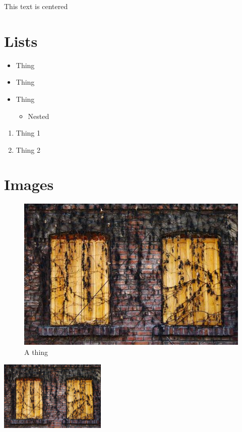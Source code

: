 \documentclass[10pt, letterpaper]{article}  %
\begin{document}
\begin{center}
    This text is centered
\end{center}



\section{Lists}

\begin{itemize}  %
    \item Thing
    \item Thing
    \item Thing
    \begin{itemize}
        \item Nested
    \end{itemize}
\end{itemize}

\noindent \hrulefill{}

\begin{enumerate}  %
    \item Thing 1
    \item Thing 2
\end{enumerate}


\section{Images}

\begin{figure}[h]  %
    \centering
    \includegraphics[width=0.75\linewidth]{images/image.jpg}
    \caption{A thing}
    \label{fig:house1}
\end{figure}


\includegraphics[width=2in]{images/image.jpg}
\end{document}
